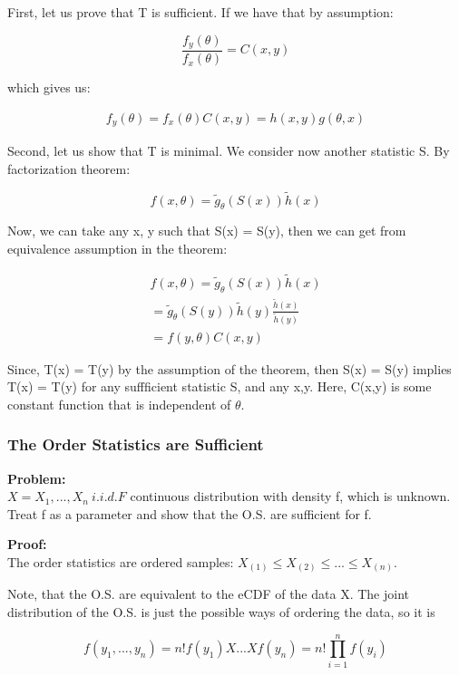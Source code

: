          First, let us prove that T is sufficient. If we have that by assumption:

          $$\frac{f_y(\theta)}{f_x(\theta)} = C(x,y)$$

          which gives us:

          \begin{align*}
            f_y(\theta) = f_x(\theta)C(x,y)
            = h(x,y)g(\theta,x)
          \end{align*}

          Second, let us show that T is minimal. We consider now another statistic S. By factorization theorem:

          $$f(x,\theta) = \tilde{g}_{\theta}(S(x))\tilde{h}(x)$$

          Now, we can take any x, y such that S(x) = S(y), then we can get from equivalence assumption in the theorem:

          \begin{align*}
            f(x, \theta) = \tilde{g}_{\theta}(S(x))\tilde{h}(x) \\
              = \tilde{g}_{\theta}(S(y))\tilde{h}(y)\frac{\tilde{h}(x)}{\tilde{h}(y)} \\
              = f(y, \theta) C(x,y)
          \end{align*}

          Since, T(x) = T(y) by the assumption of the theorem, then S(x) = S(y) implies T(x) = T(y) for any suffficient statistic S, and any x,y. Here, C(x,y) is some constant function that is independent of $\theta$.

		\subsubsection{The Order Statistics are Sufficient}

      \textbf{Problem:}\\
        $X = X_1, ..., X_n ~ i.i.d. F$ continuous distribution with density f, which is unknown. Treat f as a parameter and show that the O.S. are sufficient for f.

      \textbf{Proof:}\\
        The order statistics are ordered samples: $X_{(1)} \le X_{(2)} \le ... \le X_{(n)}$. 

        Note, that the O.S. are equivalent to the eCDF of the data X. The joint distribution of the O.S. is just the possible ways of ordering the data, so it is

        $$f(y_1, ..., y_n) = n! f(y_1) X ... X f(y_n) = n! \prod_{i=1}^n f(y_i)$$

